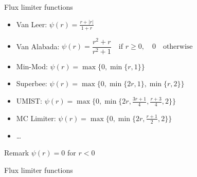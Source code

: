 \documentclass{beamer}
\begin{document}
\begin{frame}{Flux limiter functions}
	\begin{itemize}
	\item Van Leer: $\psi(r) = \frac{r+|r|}{1+r}$
	\item Van Alabada: $\psi(r)= \dfrac{r^2+r}{r^2+1} \quad \text{if $r\geq 
		0$}, \quad 0 \quad \text{otherwise}$
	\item Min-Mod: 	$\psi(r) = \max \{0, \min \{ r,1\} \}$
	\vspace{0.4\baselineskip}
	\item Superbee: $\psi(r)=\max \{0, \min \{ 2r, 1\}, \min \{ r, 2\} \}$
	\vspace{0.2\baselineskip}
	\item UMIST: $\psi(r)=\max \bigg\{0, \min \bigg\{ 2r, \frac{3r+1}{4}, 
	\frac{r+3}{4}, 2\bigg\} \bigg\}$
	\item MC Limiter: $\psi(r)=\max \bigg\{0, \min \bigg\{ 2r, \frac{r+1}{2}, 
	2\bigg\} \bigg\}$
	\item \dots
	\end{itemize}
\begin{block}{Remark} %
	\centering
$\psi(r) = 0$ for $r<0$
\end{block}
\end{frame}
\begin{frame}{Flux limiter functions}
\begin{figure}
	\centering
	\hspace{-1cm}
	
\end{figure}
\end{frame}
\end{document}
